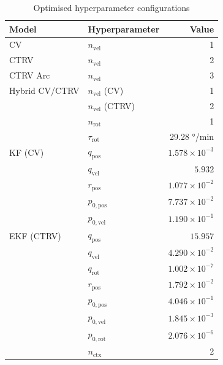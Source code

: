         
            \begin{table}[h] %
            \centering
            \caption{Optimised hyperparameter configurations}
            \label{tab:hpo_results_exp0}
            \begin{tabular}{llr}
            \toprule
            \textbf{Model} & \textbf{Hyperparameter} & \textbf{Value} \\
            \midrule
            CV
              & $n_\text{vel}$            & 1 \\
            CTRV
              & $n_\text{vel}$            & 2 \\
            CTRV Arc
              & $n_\text{vel}$            & 3 \\
            Hybrid CV/CTRV
              & $n_\text{vel}$ (CV)       & 1 \\
              & $n_\text{vel}$ (CTRV)     & 2 \\
              & $n_\text{rot}$            & 1 \\
              & $\tau_\text{rot}$         & 29.28 °/min \\
            \midrule
            KF (CV)
              & $q_\text{pos}$            & $1.578 \times 10^{-3}$ \\
              & $q_\text{vel}$            & $5.932$ \\
              & $r_\text{pos}$            & $1.077 \times 10^{-2}$ \\
              & $p_{0,\text{pos}}$        & $7.737 \times 10^{-2}$ \\
              & $p_{0,\text{vel}}$        & $1.190 \times 10^{-1}$ \\
            EKF (CTRV)
              & $q_\text{pos}$            & $15.957$ \\
              & $q_\text{vel}$            & $4.290 \times 10^{-2}$ \\
              & $q_\text{rot}$            & $1.002 \times 10^{-7}$ \\
              & $r_\text{pos}$            & $1.792 \times 10^{-2}$ \\
              & $p_{0,\text{pos}}$        & $4.046 \times 10^{-1}$ \\
              & $p_{0,\text{vel}}$        & $1.845 \times 10^{-3}$ \\
              & $p_{0,\text{rot}}$        & $2.076 \times 10^{-6}$ \\
              & $n_\text{ctx}$            & 2 \\

\end{tabular}
\end{table}
